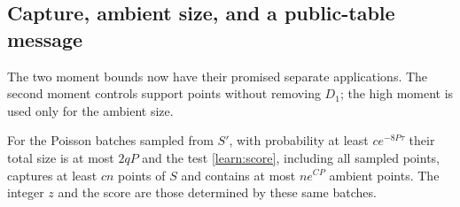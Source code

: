 \subsection{Capture, ambient size, and a public-table message}

The two moment bounds now have their promised separate applications.
The second moment controls support points without removing $D_1$;
the high moment is used only for the ambient size.

\begin{lemma}\label{learn:row-success}
For the Poisson batches sampled from $S'$, with probability at least
$c e^{-8P\tau}$ their total size is at most $2qP$ and the test
\eqref{learn:score}, including all sampled points, captures at least
$c n$ points of $S$ and contains at most $n e^{CP}$ ambient points.
The integer $z$ and the score are those determined by these same batches.
\end{lemma}


